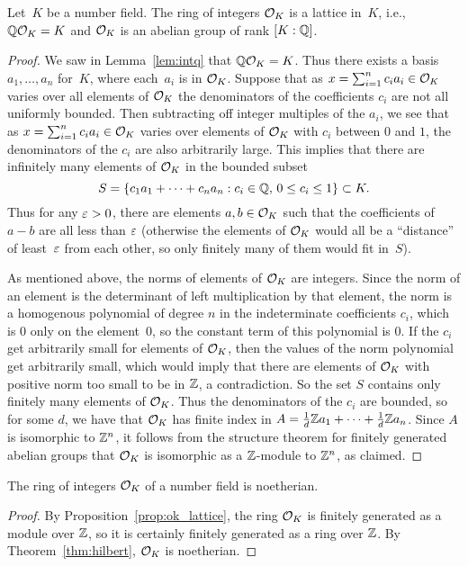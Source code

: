 \begin{proposition}\label{prop:ok_lattice}
Let~$K$ be a number field.  The ring of integers $\mathcal{O}_K$ is a lattice
in~$K$, i.e., $\mathbb{Q}\mathcal{O}_K=K$ and $\mathcal{O}_K$ is an abelian group of rank $[K:\mathbb{Q}]$.
\end{proposition}
\begin{proof}
We saw in Lemma~\ref{lem:intq} that $\mathbb{Q}\mathcal{O}_K=K$.  Thus there exists a
basis $a_1,\ldots, a_n$ for~$K$, where each~$a_i$ is in $\mathcal{O}_K$.
Suppose that as $x=\sum_{i=1}^n c_i a_i\in \mathcal{O}_K$ varies over all
elements of $\mathcal{O}_K$ the denominators of the coefficients $c_i$ are not
all uniformly bounded.  Then subtracting off integer multiples of the
$a_i$, we see that as $x=\sum_{i=1}^n c_i a_i\in \mathcal{O}_K$ varies over
elements of $\mathcal{O}_K$ with $c_i$ between $0$ and $1$, the denominators of
the $c_i$ are also arbitrarily large.  This implies that there are
infinitely many elements of $\mathcal{O}_K$ in the bounded subset
$$S = \left\{c_1 a_1 +\cdots + c_n a_n : c_i \in \mathbb{Q},\, 0\leq c_i \leq 1\right\}\subset K.$$
Thus for any $\varepsilon>0$, there are elements $a,b\in \mathcal{O}_K$ such that the
coefficients of $a-b$ are all less than $\varepsilon$ (otherwise the elements
of $\mathcal{O}_K$ would all be a ``distance'' 
of least~$\varepsilon$ from each other, so only finitely
many of them would fit in~$S$).

As mentioned above, the norms of elements of $\mathcal{O}_K$ are integers.
Since the norm of an element is the determinant of left multiplication
by that element, the norm is a homogenous polynomial of degree $n$ in
the indeterminate coefficients $c_i$, which is $0$ only on the
element~$0$, so the constant term of this polynomial is $0$.  If the $c_i$ get arbitrarily small for elements of
$\mathcal{O}_K$, then the values of the norm polynomial get arbitrarily small,
which would imply that there are elements of $\mathcal{O}_K$ with positive norm
too small to be in $\mathbb{Z}$, a contradiction.  So the set $S$ contains
only finitely many elements of $\mathcal{O}_K$.  Thus the denominators of the
$c_i$ are bounded, so for some $d$, we have that $\mathcal{O}_K$ has finite
index in $A=\frac{1}{d}\mathbb{Z} a_1 + \cdots + \frac{1}{d}\mathbb{Z} a_n$.  Since
$A$ is isomorphic to $\mathbb{Z}^n$, it follows from the structure theorem for
finitely generated abelian groups that $\mathcal{O}_K$ is isomorphic as a
$\mathbb{Z}$-module to $\mathbb{Z}^n$, as claimed.
\end{proof}

\begin{corollary}\label{prop:intnoetherian}
The ring of integers $\mathcal{O}_K$ of a number field is noetherian.
\end{corollary}
\begin{proof}
By Proposition~\ref{prop:ok_lattice}, the ring $\mathcal{O}_K$ is
finitely generated as a module over $\mathbb{Z}$, so it is certainly
finitely generated as a ring over $\mathbb{Z}$.  By Theorem~\ref{thm:hilbert},
 $\mathcal{O}_K$ is noetherian.
\end{proof}


